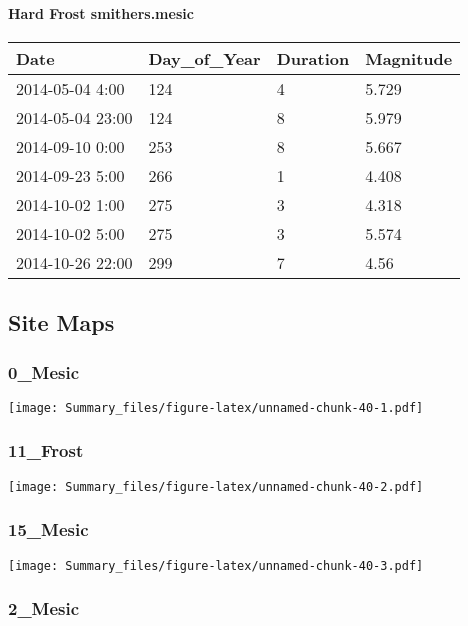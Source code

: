 \documentclass[
]{article}
\begin{document}
\hypertarget{hard-frost-smithers.mesic}{%
\paragraph{Hard Frost smithers.mesic}\label{hard-frost-smithers.mesic}}

\begin{tabular}{l|l|l|l}
\hline
Date & Day\_of\_Year & Duration & Magnitude\\
\hline
2014-05-04 4:00 & 124 & 4 & 5.729\\
\hline
2014-05-04 23:00 & 124 & 8 & 5.979\\
\hline
2014-09-10 0:00 & 253 & 8 & 5.667\\
\hline
2014-09-23 5:00 & 266 & 1 & 4.408\\
\hline
2014-10-02 1:00 & 275 & 3 & 4.318\\
\hline
2014-10-02 5:00 & 275 & 3 & 5.574\\
\hline
2014-10-26 22:00 & 299 & 7 & 4.56\\
\hline
\end{tabular}

\hypertarget{site-maps}{%
\subsection{Site Maps}\label{site-maps}}

\hypertarget{mesic-12}{%
\subsubsection{0\_Mesic}\label{mesic-12}}

\texttt{[image: Summary\_files/figure-latex/unnamed-chunk-40-1.pdf]}

\hypertarget{frost-2}{%
\subsubsection{11\_Frost}\label{frost-2}}

\texttt{[image: Summary\_files/figure-latex/unnamed-chunk-40-2.pdf]}

\hypertarget{mesic-13}{%
\subsubsection{15\_Mesic}\label{mesic-13}}

\texttt{[image: Summary\_files/figure-latex/unnamed-chunk-40-3.pdf]}

\hypertarget{mesic-14}{%
\subsubsection{2\_Mesic}\label{mesic-14}}
\end{document}
